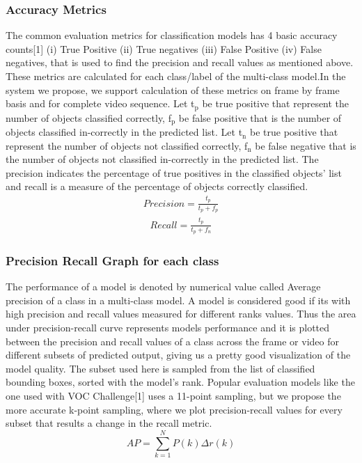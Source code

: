 \documentclass[conference]{IEEEtran}
\begin{document}
\subsubsection{Accuracy Metrics} \label{ref.accuracy}
The common evaluation metrics for classification models has 4 basic accuracy counts[1] (i) True Positive (ii) True negatives (iii) False Positive (iv) False negatives, that is used to find the precision and recall values as mentioned above. These metrics are calculated for each class/label of the multi-class model.In the system we propose, we support calculation of these metrics on frame by frame basis and for complete video sequence. Let t{$_{\text{p}}$} be true positive that represent the number of objects classified correctly, f{$_{\text{p}}$} be false positive that is the number of objects classified in-correctly in the predicted list.  Let t{$_{\text{n}}$} be true positive that represent the number of objects not classified correctly, f{$_{\text{n}}$} be false negative that is the number of objects not classified in-correctly in the predicted list. The precision indicates the percentage of true positives in the classified objects' list and recall is a measure of the percentage of objects correctly classified.
\begin{align}
{Precision}= \frac {t_p} {t_p + f_p}
\end{align}
\begin{align}
{Recall}= \frac {t_p} {t_p + f_n}
\end{align}
\subsubsection{Precision Recall Graph for each class}
The performance of a model is denoted by numerical value called Average precision of a class in a multi-class model. A model is considered good if its with high precision and recall values measured for different ranks values. Thus the area under precision-recall curve represents models performance and it is plotted between the precision and recall values of a class across the frame or video for different subsets of predicted output, giving us a pretty good visualization of the model quality. The subset used here is sampled from the list of classified bounding boxes, sorted with the model's rank. Popular evaluation models like the one used with VOC Challenge[1] uses a 11-point sampling, but we propose the more accurate k-point sampling, where we plot precision-recall values for every subset that results a change in the recall metric.
	$${AP} = \sum_{k=1}^{N} P(k) {\Delta}r(k)$$
\end{document}
